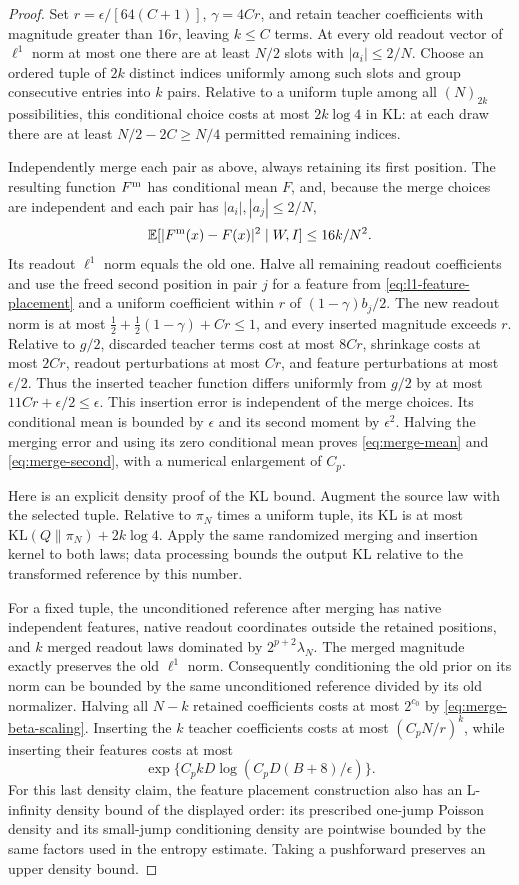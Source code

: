 \begin{proof}
Set $r=\epsilon/[64(C+1)]$, $\gamma=4Cr$, and retain teacher coefficients
with magnitude greater than $16r$, leaving $k\le C$ terms. At every old
readout vector of $\ell^1$ norm at most one there are at least $N/2$ slots
with $|a_i|\le2/N$. Choose an ordered tuple of $2k$ distinct indices
uniformly among such slots and group consecutive entries into $k$ pairs.
Relative to a uniform tuple among all $(N)_{2k}$ possibilities, this
conditional choice costs at most $2k\log4$ in KL: at each draw there
are at least $N/2-2C\ge N/4$ permitted remaining indices.

Independently merge each pair as above, always retaining its first
position. The resulting function $F^{\rm m}$ has conditional mean $F$,
and, because the merge choices are independent and each pair has
$|a_i|,|a_j|\le2/N$,
\[
 \mathbb E[|F^{\rm m}(x)-F(x)|^2\mid W,I]\le16k/N^2.
\]
Its readout $\ell^1$ norm equals the old one. Halve all remaining readout
coefficients and use the freed second position in pair $j$ for a feature
from \eqref{eq:l1-feature-placement} and a uniform coefficient within
$r$ of $(1-\gamma)b_j/2$. The new readout norm is at most
$\frac12+\frac12(1-\gamma)+Cr\le1$, and every inserted
magnitude exceeds $r$. Relative to $g/2$, discarded teacher terms
cost at most $8Cr$, shrinkage costs at most $2Cr$, readout perturbations
at most $Cr$, and feature perturbations at most $\epsilon/2$.
Thus the inserted teacher function differs uniformly from $g/2$ by at
most $11Cr+\epsilon/2\le\epsilon$. This insertion error is independent of
the merge choices. Its conditional mean is bounded by $\epsilon$ and
its second moment by $\epsilon^2$. Halving the merging error and using
its zero conditional mean proves \eqref{eq:merge-mean} and
\eqref{eq:merge-second}, with a numerical enlargement of $C_p$.

Here is an explicit density proof of the KL bound. Augment the source
law with the selected tuple. Relative to $\pi_N$ times a uniform
tuple, its KL is at most $\mathrm{KL}(Q\|\pi_N)+2k\log4$.
Apply the same randomized merging and insertion kernel to both laws;
data processing bounds the output KL relative to the transformed
reference by this number.

For a fixed tuple, the unconditioned reference after merging has native
independent features, native readout coordinates outside the retained
positions, and $k$ merged readout laws dominated by $2^{p+2}\lambda_N$.
The merged magnitude exactly preserves the old $\ell^1$ norm. Consequently
conditioning the old prior on its norm can be bounded by the same
unconditioned reference divided by its old normalizer. Halving all
$N-k$ retained coefficients costs at most $2^{c_0}$ by
\eqref{eq:merge-beta-scaling}. Inserting the $k$ teacher coefficients
costs at most $(C_pN/r)^k$, while inserting their features costs at most
\[
 \exp\{C_p kD\log(C_pD(B+8)/\epsilon)\}.
\]
For this last density claim, the feature placement construction also
has an L-infinity density bound of the displayed order: its prescribed
one-jump Poisson density and its small-jump conditioning density are
pointwise bounded by the same factors used in the entropy estimate.
Taking a pushforward preserves an upper density bound.


\end{proof}
